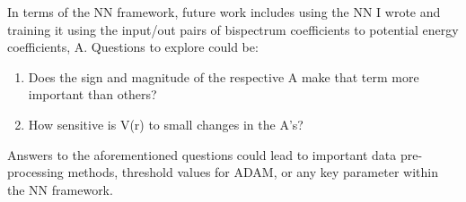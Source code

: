 \documentclass{article}
\begin{document}
In terms of the NN framework, future work includes using the NN I wrote and training it using the 
input/out pairs of bispectrum coefficients to potential energy coefficients, A. Questions to 
explore could be:

\begin{enumerate}
    \item Does the sign and magnitude of the respective A make that term more important than others?
    \item How sensitive is V(r) to small changes in the A's?
\end{enumerate}
\noindent
Answers to the aforementioned questions could lead to important data pre-processing methods, 
threshold values for ADAM, or any key parameter within the NN framework. 

\clearpage

\end{document}
